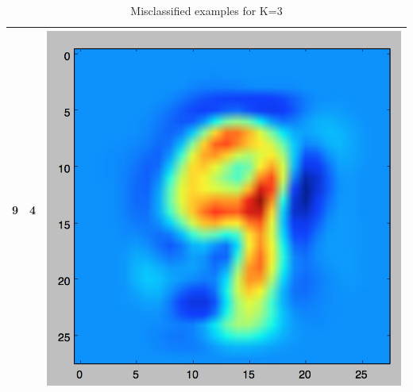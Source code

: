 \documentclass[11pt]{article}
\begin{document}
\begin{table}[!th]
\begin{tabular}{|c|c|c|}
\hline
9 & 4 & \includegraphics[scale=.15]{images/knn3_9_4.png} \\
\hline
\end{tabular}
\caption{Misclassified examples for K=3}
\label{ex:table}
\end{table}
\end{document}
